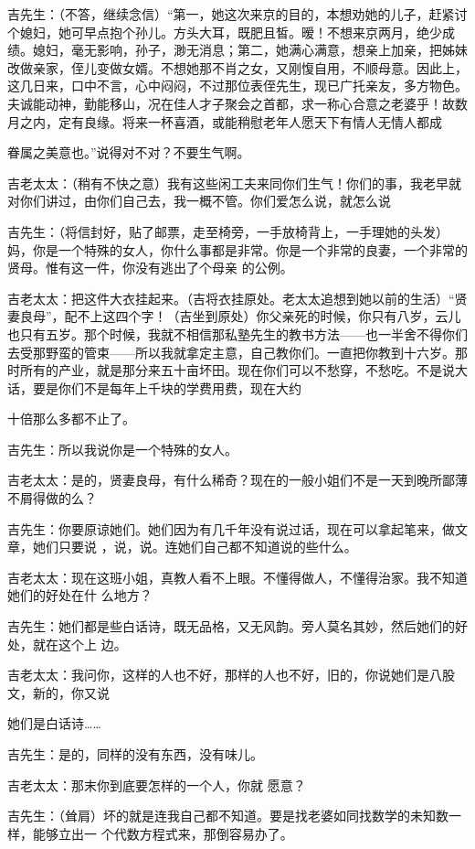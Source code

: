 \documentclass{article}
\begin{document}
吉先生：（不答，继续念信）“第一，她这次来京的目的，本想劝她的儿子，赶紧讨个媳妇，她可早点抱个孙儿。方头大耳，既肥且皙。暧！不想来京两月，绝少成绩。媳妇，毫无影响，孙子，渺无消息；第二，她满心满意，想亲上加亲，把姊妹改做亲家，侄儿变做女婿。不想她那不肖之女，又刚愎自用，不顺母意。因此上，这几日来，口中不言，心中闷闷，不过那位表侄先生，现已广托亲友，多方物色。夫诚能动神，勤能移山，况在佳人才子聚会之首都，求一称心合意之老婆乎！故数月之内，定有良缘。将来一杯喜酒，或能稍慰老年人愿天下有情人无情人都成
\newpage

眷属之美意也。”说得对不对？不要生气啊。 

吉老太太：（稍有不快之意）我有这些闲工夫来同你们生气！你们的事，我老早就对你们讲过，由你们自己去，我一概不管。你们爱怎么说，就怎么说

吉先生：（将信封好，贴了邮票，走至椅旁，一手放椅背上，一手理她的头发）妈，你是一个特殊的女人，你什么事都是非常。你是一个非常的良妻，一个非常的贤母。惟有这一件，你没有逃出了个母亲
的公例。 

吉老太太：把这件大衣挂起来。（吉将衣挂原处。老太太追想到她以前的生活）“贤妻良母”，配不上这四个字！（吉坐到原处）你父亲死的时候，你只有八岁，云儿也只有五岁。那个时候，我就不相信那私塾先生的教书方法——也一半舍不得你们去受那野蛮的管束——所以我就拿定主意，自己教你们。一直把你教到十六岁。那时所有的产业，就是那分来五十亩坏田。现在你们可以不愁穿，不愁吃。不是说大话，要是你们不是每年上千块的学费用费，现在大约
\newpage

十倍那么多都不止了。 


吉先生：所以我说你是一个特殊的女人。 

吉老太太：是的，贤妻良母，有什么稀奇？现在的一般小姐们不是一天到晚所鄙薄不屑得做的么？

吉先生：你要原谅她们。她们因为有几千年没有说过话，现在可以拿起笔来，做文章，她们只要说
，说，说。连她们自己都不知道说的些什么。 

吉老太太：现在这班小姐，真教人看不上眼。不懂得做人，不懂得治家。我不知道她们的好处在什
么地方？ 

吉先生：她们都是些白话诗，既无品格，又无风韵。旁人莫名其妙，然后她们的好处，就在这个上
边。 

吉老太太：我问你，这样的人也不好，那样的人也不好，旧的，你说她们是八股文，新的，你又说
\newpage

她们是白话诗…… 

吉先生：是的，同样的没有东西，没有味儿。

吉老太太：那末你到底要怎样的一个人，你就
愿意？ 

吉先生：（耸肩）坏的就是连我自己都不知道。要是找老婆如同找数学的未知数一样，能够立出一
个代数方程式来，那倒容易办了。 
\end{document}
